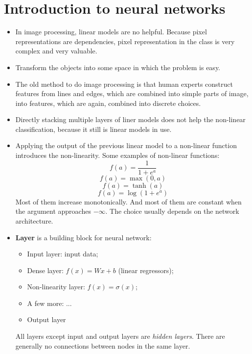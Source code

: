 \documentclass[]{article}
\begin{document}
\section{Introduction to neural networks}
\begin{itemize}
	\item In image processing, linear models are no helpful. Because pixel representations are dependencies, pixel representation in the class is very complex and very valuable.
	\item Transform the objects into some space in which the problem is easy.
	\item The old method to do image processing is that human experts construct features from lines and edges, which are combined into simple parts of image, into features, which are again, combined into discrete choices.
	\item Directly stacking multiple layers of liner models does not help the non-linear classification, because it still is linear models in use.
	\item Applying the output of the previous linear model to a non-linear function introduces the non-linearity. Some examples of non-linear functions:
	\begin{equation}
	f(a)=\frac{1}{1+e^a}
	\end{equation}
	\begin{equation}
	f(a)=\max{(0,a)}
	\end{equation}
	\begin{equation}
	f(a)=\tanh{(a)}
	\end{equation}
	\begin{equation}
	f(a) = \log{(1+e^a)}
	\end{equation}
	Most of them increase monotonically. And most of them are constant when the argument approaches $-\infty$. The choice usually depends on the network architecture.
	
	\item \textbf{Layer} is a building block for neural network:
	\begin{itemize}
		\item Input layer: input data;
		\item Dense layer: $f(x)=Wx+b$ (linear regressors);
		\item Non-linearity layer: $f(x)=\sigma(x)$;
		\item A few more: ...
		\item Output layer
	\end{itemize}
	All layers except input and output layers are \textit{hidden layers}.
	There are generally no connections between nodes in the same layer. 
	

\end{itemize}
\end{document}
